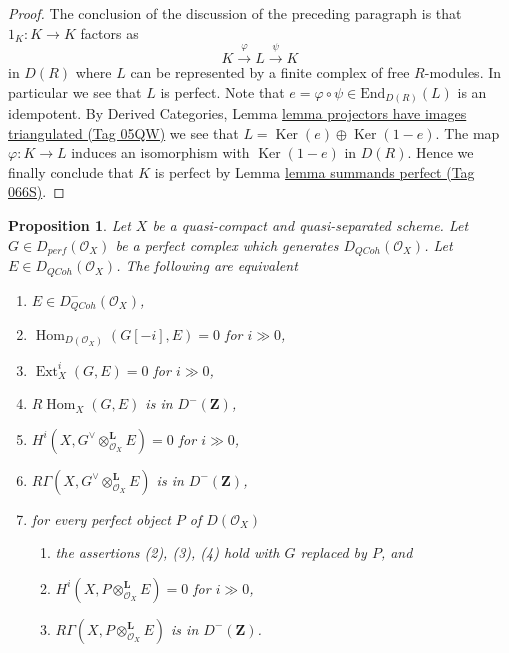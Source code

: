 \documentclass{amsart}
\theoremstyle{plain}
\newtheorem{proposition}[subsection]{Proposition}
\theoremstyle{definition}
\theoremstyle{remark}
\numberwithin{equation}{subsection}
\def\Hom{\mathop{\mathrm{Hom}}\nolimits}
\def\Ext{\mathop{\mathrm{Ext}}\nolimits}
\def\QCoh{\mathit{QCoh}}
\def\Ker{\mathop{\mathrm{Ker}}}
\begin{document}
\begin{proof}
\medskip\noindent
The conclusion of the discussion of the preceding paragraph is that
$1_K : K \to K$ factors as
$$
K \xrightarrow{\varphi} L \xrightarrow{\psi} K
$$
in $D(R)$ where $L$ can be represented by a finite
complex of free $R$-modules. In particular we see that $L$ is
perfect. Note that $e = \varphi \circ \psi \in \text{End}_{D(R)}(L)$
is an idempotent. By Derived Categories,
Lemma \href{https://stacks.math.columbia.edu/tag/05QW}{lemma projectors have images triangulated (Tag 05QW)}
we see that $L = \Ker(e) \oplus \Ker(1 - e)$.
The map $\varphi : K \to L$ induces an isomorphism with
$\Ker(1 - e)$ in $D(R)$. Hence we finally conclude that
$K$ is perfect by Lemma \href{https://stacks.math.columbia.edu/tag/066S}{lemma summands perfect (Tag 066S)}.
\end{proof}





\begin{proposition}
\label{proposition-detecting-bounded-above}
Let $X$ be a quasi-compact and quasi-separated scheme. Let
$G \in D_{perf}(\mathcal{O}_X)$ be a perfect complex which generates 
$D_\QCoh (\mathcal{O}_X)$. Let $E \in D_\QCoh (\mathcal{O}_X)$.
The following are equivalent
\begin{enumerate}
\item $E \in D^-_\QCoh (\mathcal{O}_X)$,
\item $\Hom_{D(\mathcal{O}_X)}(G[-i], E) = 0$ for $i \gg 0$,
\item $\Ext^i_X(G, E) = 0$ for $i \gg 0$,
\item $R\Hom_X(G, E)$ is in $D^-(\mathbf{Z})$,
\item $H^i(X, G^\vee \otimes_{\mathcal{O}_X}^\mathbf{L} E) = 0$
for $i \gg 0$,
\item $R\Gamma(X, G^\vee \otimes_{\mathcal{O}_X}^\mathbf{L} E)$
is in $D^-(\mathbf{Z})$,
\item for every perfect object $P$ of $D(\mathcal{O}_X)$
\begin{enumerate}
\item the assertions (2), (3), (4) hold with $G$ replaced by $P$, and
\item $H^i(X, P \otimes_{\mathcal{O}_X}^\mathbf{L} E) = 0$ for $i \gg 0$,
\item $R\Gamma(X, P \otimes_{\mathcal{O}_X}^\mathbf{L} E)$
is in $D^-(\mathbf{Z})$.
\end{enumerate}
\end{enumerate}
\end{proposition}
\end{document}
